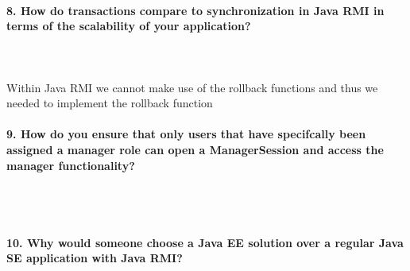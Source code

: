 \documentclass{ds-report}
\begin{document}
	\paragraph{8. How do transactions compare to synchronization in Java RMI in terms of the scalability of your application?} \mbox{}\\\\
Within Java RMI we cannot make use of the rollback functions and thus we needed to implement the rollback function










	\paragraph{9. How do you ensure that only users that have specifcally been assigned a manager role can open a ManagerSession and access the manager functionality?} \mbox{}\\\\








	\paragraph{10.  Why would someone choose a Java EE solution over a regular Java SE application with Java RMI?} \mbox{}\\\\



	
	\clearpage

	
\end{document}
